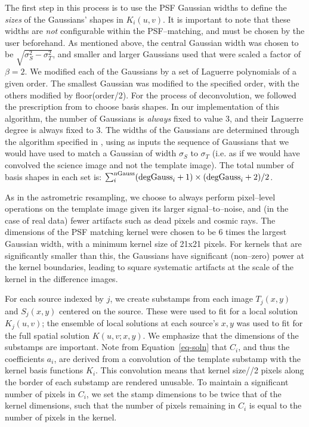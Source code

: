 \documentclass[floatfix, apj]{emulateapj}
\begin{document}
The first step in this process is to use the PSF Gaussian widths to define the {\it sizes} of the Gaussians' shapes in $K_i(u,v)$.
It is important to note that these widths are {\it not} configurable within the PSF--matching, and must be chosen by the user beforehand.
As mentioned above, the central Gaussian width was chosen to be $\sqrt{\sigma_S^2 - \sigma_T^2}$, and smaller and larger Gaussians used that were scaled a factor of $\beta = 2$.
We modified each of the Gaussians by a set of Laguerre polynomials of a given order.
The smallest Gaussian was modified to the specified order, with the others modified by floor(order/2).
For the process of deconvolution, we followed the prescription from \cite{0266-5611-26-8-085002} to choose basis shapes.
In our implementation of this algorithm, the number of Gaussians is {\it always} fixed to value 3, and their Laguerre degree is always fixed to 3.
The  widths of the Gaussians are determined through the algorithm specified in \cite{0266-5611-26-8-085002}, using as inputs the sequence of Gaussians that we would have used to match a Gaussian of
  width $\sigma_S$ to $\sigma_T$ (i.e. as if we would have convolved the science image and not the template image).
The total number of basis shapes in each set is: $\sum_i^{\rm nGauss} ({\rm degGauss}_i+1)\times({\rm degGauss}_i+2)/2$.

As in the astrometric resampling, we choose to always perform pixel--level operations on the template image given its larger signal--to--noise, and (in the case of real data) fewer artifacts such as dead pixels and cosmic rays.
The dimensions of the PSF matching kernel were chosen to be 6 times the largest Gaussian width, with a minimum kernel size of 21x21 pixels.
For kernels that are significantly smaller than this, the Gaussians have significant (non--zero) power at the kernel boundaries, leading to square systematic artifacts at the scale of the kernel in the difference images.

For each source indexed by $j$, we create substamps from each image $T_j(x,y)$ and $S_j(x,y)$ centered on the source.
These were used to fit for a local solution $K_j(u,v)$; the ensemble of local solutions at each source's $x,y$ was used to fit for the full spatial solution $K(u,v;x,y)$.
We emphasize that the dimensions of the substamps are important.
Note from Equation~\ref{eq-soln} that $C_i$, and thus the coefficients $a_i$, are derived from a convolution of the template substamp with the kernel basis functions $K_i$.
This convolution means that kernel size//2 pixels along the border of each substamp are rendered unusable.
To maintain a significant number of pixels in $C_i$, we set the stamp dimensions to be twice that of the kernel dimensions, such that the number of pixels remaining in $C_i$ is equal to the number of pixels in the kernel.
\end{document}
